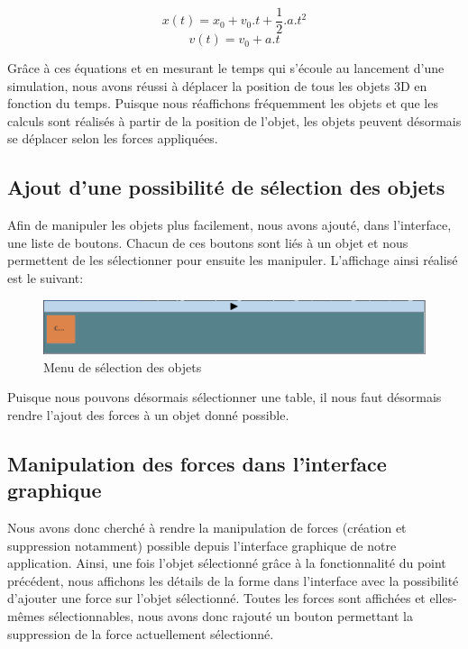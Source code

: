 \documentclass[11pt]{report}
\begin{document}
\[
      x(t) = x_{0} + v_{0} . t + \frac{1}{2}.a.t^{2}
\]
\[
      v(t) = v_{0} + a.t
\]

Grâce à ces équations et en mesurant le temps qui s'écoule au lancement d'une simulation, nous avons réussi à déplacer
la position de tous les objets 3D en fonction du temps. Puisque nous réaffichons fréquemment les objets et que les calculs sont réalisés
à partir de la position de l'objet, les objets peuvent désormais se déplacer selon les forces appliquées.\newline


\subsection{Ajout d'une possibilité de sélection des objets}

Afin de manipuler les objets plus facilement, nous avons ajouté, dans l'interface, une liste de boutons. Chacun de ces boutons
sont liés à un objet et nous permettent de les sélectionner pour ensuite les manipuler. L'affichage ainsi réalisé est le suivant:

\begin{figure}[h]
  \centering
  \includegraphics[scale=0.5]{./selectionObjet.png}
  \caption{Menu de sélection des objets}
\end{figure}

Puisque nous pouvons désormais sélectionner une table, il nous faut désormais rendre l'ajout des forces à un objet donné possible.


\subsection{Manipulation des forces dans l'interface graphique}

Nous avons donc cherché à rendre la manipulation de forces (création et suppression notamment) possible depuis l'interface graphique
de notre application. Ainsi, une fois l'objet sélectionné grâce à la fonctionnalité du point précédent, nous affichons les détails
de la forme dans l'interface avec la possibilité d'ajouter une force sur l'objet sélectionné. Toutes les forces sont affichées
et elles-mêmes sélectionnables, nous avons donc rajouté un bouton permettant la suppression de la force actuellement sélectionné.
\end{document}
